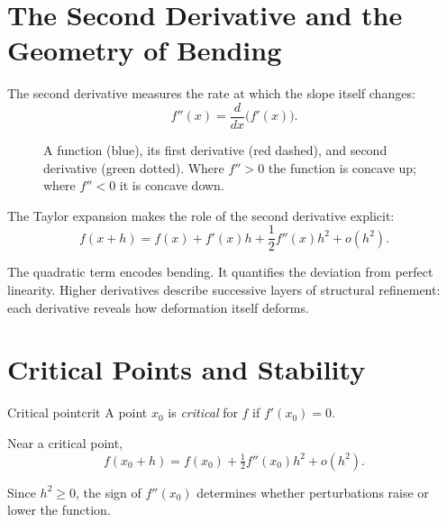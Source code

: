 \documentclass[12pt,openany]{book}
\begin{document}
\section{The Second Derivative and the Geometry of Bending}

The second derivative measures the rate at which the slope itself changes:
\[
  f''(x) = \frac{d}{dx}\bigl(f'(x)\bigr).
\]

\begin{figure}[H]
\centering
{}
\caption{A function (blue), its first derivative (red dashed), and second
derivative (green dotted). Where $f''>0$ the function is concave up; where
$f''<0$ it is concave down.}
\label{fig:deriv-hierarchy}
\end{figure}

The Taylor expansion makes the role of the second derivative explicit:
\[
  f(x+h) = f(x) + f'(x)h + \frac{1}{2}f''(x)h^2 + o(h^2).
\]

The quadratic term encodes bending. It quantifies the deviation from perfect
linearity. Higher derivatives describe successive layers of structural
refinement: each derivative reveals how deformation itself deforms.

\section{Critical Points and Stability}

\begin{definition}{Critical point}{crit}
  A point $x_0$ is \emph{critical} for $f$ if $f'(x_0)=0$.
\end{definition}

Near a critical point,
\[
  f(x_0 + h) = f(x_0) + \tfrac{1}{2}f''(x_0)h^2 + o(h^2).
\]

Since $h^2 \ge 0$, the sign of $f''(x_0)$ determines whether perturbations
raise or lower the function.
\end{document}

